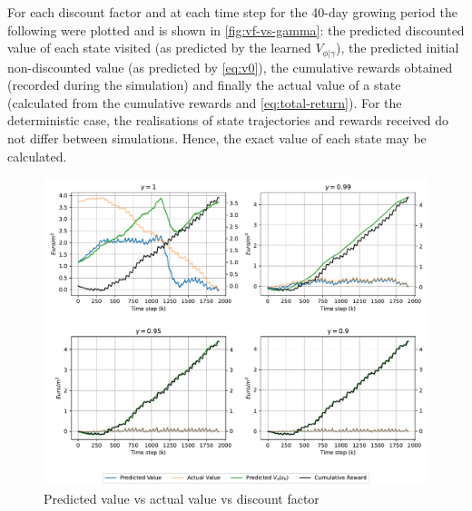 For each discount factor and at each time step for the 40-day growing period the following were plotted and is shown in \autoref{fig:vf-vs-gamma}: the predicted discounted value of each state visited (as predicted by the learned $V_{\phi|\gamma}$), the predicted initial non-discounted value (as predicted by \autoref{eq:v0}), the cumulative rewards obtained (recorded during the simulation) and finally the actual value of a state (calculated from the cumulative rewards and \autoref{eq:total-return}). For the deterministic case, the realisations of state trajectories and rewards received do not differ between simulations. Hence, the exact value of each state may be calculated. 

\begin{figure}[H]
    \centering
    \includegraphics[width = \textwidth]{figures/vf_vs_gamma.pdf}
    \caption{Predicted value vs actual value vs discount factor}
    \label{fig:vf-vs-gamma}
\end{figure}

